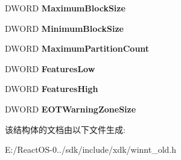 \begin{DoxyCompactItemize}
\item 
\mbox{\label{struct___t_a_p_e___g_e_t___d_r_i_v_e___p_a_r_a_m_e_t_e_r_s_add1b08e404d2fb4661450c1f34280b80}} 
D\+W\+O\+RD {\bfseries Maximum\+Block\+Size}
\item 
\mbox{\label{struct___t_a_p_e___g_e_t___d_r_i_v_e___p_a_r_a_m_e_t_e_r_s_a6d0885e507a7d9bfcb0cdb052ff2d436}} 
D\+W\+O\+RD {\bfseries Minimum\+Block\+Size}
\item 
\mbox{\label{struct___t_a_p_e___g_e_t___d_r_i_v_e___p_a_r_a_m_e_t_e_r_s_aacc98f4224756701fef6ed9a0bd892eb}} 
D\+W\+O\+RD {\bfseries Maximum\+Partition\+Count}
\item 
\mbox{\label{struct___t_a_p_e___g_e_t___d_r_i_v_e___p_a_r_a_m_e_t_e_r_s_aab34611620ef739425b016b81f86f179}} 
D\+W\+O\+RD {\bfseries Features\+Low}
\item 
\mbox{\label{struct___t_a_p_e___g_e_t___d_r_i_v_e___p_a_r_a_m_e_t_e_r_s_afaff2541024c0c78fd11f020ecab5ca2}} 
D\+W\+O\+RD {\bfseries Features\+High}
\item 
\mbox{\label{struct___t_a_p_e___g_e_t___d_r_i_v_e___p_a_r_a_m_e_t_e_r_s_ae932496dfd7e0bd7a039388b06e845a6}} 
D\+W\+O\+RD {\bfseries E\+O\+T\+Warning\+Zone\+Size}
\end{DoxyCompactItemize}


该结构体的文档由以下文件生成\+:\begin{DoxyCompactItemize}
\item 
E\+:/\+React\+O\+S-\/0../sdk/include/xdk/winnt\+\_\+old.\+h\end{DoxyCompactItemize}
